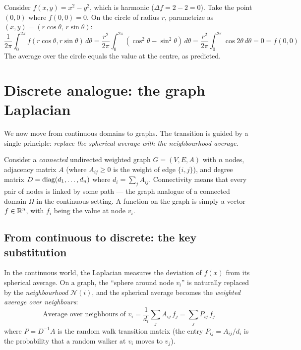 \begin{notechapter}
\begin{example}
Consider $f(x,y) = x^2 - y^2$, which is harmonic ($\Delta f = 2 - 2 = 0$).
Take the point $(0,0)$ where $f(0,0) = 0$. On the circle of radius $r$,
parametrize as $(x,y) = (r\cos\theta,\, r\sin\theta)$:
\[
\frac{1}{2\pi} \int_0^{2\pi} f(r\cos\theta, r\sin\theta)\,d\theta
= \frac{r^2}{2\pi} \int_0^{2\pi} (\cos^2\theta - \sin^2\theta)\,d\theta
= \frac{r^2}{2\pi} \int_0^{2\pi} \cos 2\theta\,d\theta = 0 = f(0,0)
\]
The average over the circle equals the value at the centre, as predicted.
\end{example}


\section{Discrete analogue: the graph Laplacian}
\label{harmonic-functions:sec:graph_laplacian}

We now move from continuous domains to graphs. The transition is guided by a
single principle: \emph{replace the spherical average with the neighbourhood
average}.

Consider a \emph{connected} undirected weighted graph $G = (V, E, A)$ with
$n$ nodes, adjacency matrix $A$ (where $A_{ij} \geq 0$ is the weight of edge
$\{i,j\}$), and degree matrix $D = \operatorname{diag}(d_1, \ldots, d_n)$ where
$d_i = \sum_j A_{ij}$. Connectivity means that every pair of nodes is linked
by some path --- the graph analogue of a connected domain $\Omega$ in the
continuous setting. A function on the graph is simply a vector
$f \in \mathbb{R}^n$, with $f_i$ being the value at node $v_i$.

\subsection{From continuous to discrete: the key substitution}

In the continuous world, the Laplacian measures the deviation of $f(x)$ from
its spherical average. On a graph, the ``sphere around node $v_i$'' is
naturally replaced by the \emph{neighbourhood} $\mathcal{N}(i)$, and the
spherical average becomes the \emph{weighted average over neighbours}:
\begin{equation}
\text{Average over neighbours of } v_i
= \frac{1}{d_i}\sum_{j} A_{ij}\,f_j
= \sum_j P_{ij}\,f_j
\end{equation}
where $P = D^{-1}A$ is the random walk transition matrix (the entry $P_{ij}
= A_{ij}/d_i$ is the probability that a random walker at $v_i$ moves to
$v_j$).


\end{notechapter}
